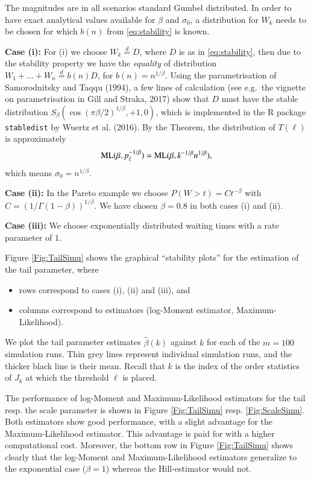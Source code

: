 \documentclass[]{elsarticle} %
\providecommand{\tightlist}{%
  \setlength{\itemsep}{0pt}\setlength{\parskip}{0pt}}
\begin{document}
The magnitudes are in all scenarios standard Gumbel distributed. In
order to have exact analytical values available for \(\beta\) and
\(\sigma_0\), a distribution for \(W_k\) needs to be chosen for which
\(b(n)\) from \eqref{eq:stability} is known.

\textbf{Case (i):} For (i) we choose \(W_k \stackrel{d}{=} D\), where
\(D\) is as in \eqref{eq:stability}, then due to the stability property
we have the \emph{equality} of distribution
\(W_1 + \ldots + W_n \stackrel{d}{=} b(n) D\), for
\(b(n) = n^{1/\beta}\). Using the parametrisation of Samorodnitsky and
Taqqu (1994), a few lines of calculation (see e.g.~the vignette on
parametrisation in Gill and Straka, 2017) show that \(D\) must have the
stable distribution \(S_\beta(\cos(\pi \beta/2)^{1/\beta}, +1, 0)\),
which is implemented in the R package \texttt{stabledist} by Wuertz et
al. (2016). By the Theorem, the distribution of \(T(\ell)\) is
approximately \[
{\rm ML}(\beta, p_{\ell}^{-1/\beta}) 
= {\rm ML}(\beta, k^{-1/\beta} n^{1/\beta}),
\] which means \(\sigma_0 = n^{1/\beta}\).

\textbf{Case (ii):} In the Pareto example we choose
\(P(W>t)=Ct^{-\beta}\) with \(C=(1/\Gamma(1-\beta))^{1/\beta}\). We have
chosen \(\beta=0.8\) in both cases (i) and (ii).

\textbf{Case (iii):} We choose exponentially distributed waiting times
with a rate parameter of \(1\).

Figure \ref{Fig:TailSimu} shows the graphical ``stability plots'' for
the estimation of the tail parameter, where

\begin{itemize}
\tightlist
\item
  rows correspond to cases (i), (ii) and (iii), and
\item
  columns correspond to estimators (log-Moment estimator,
  Maximum-Likelihood).
\end{itemize}

We plot the tail parameter estimates \(\hat \beta(k)\) against \(k\) for
each of the \(m=100\) simulation runs. Thin grey lines represent
individual simulation runs, and the thicker black line is their mean.
Recall that \(k\) is the index of the order statistics of \(J_k\) at
which the threshold \(\ell\) is placed.

The performance of log-Moment and Maximum-Likelihood estimators for the
tail resp. the scale parameter is shown in Figure \ref{Fig:TailSimu}
resp. \ref{Fig:ScaleSimu}. Both estimators show good performance, with a
slight advantage for the Maximum-Likelihood estimator. This advantage is
paid for with a higher computational cost. Moreover, the bottom row in
Figure \ref{Fig:TailSimu} shows clearly that the log-Moment and
Maximum-Likelihood estimators generalize to the exponential case
(\(\beta = 1\)) whereas the Hill-estimator would not.
\end{document}

